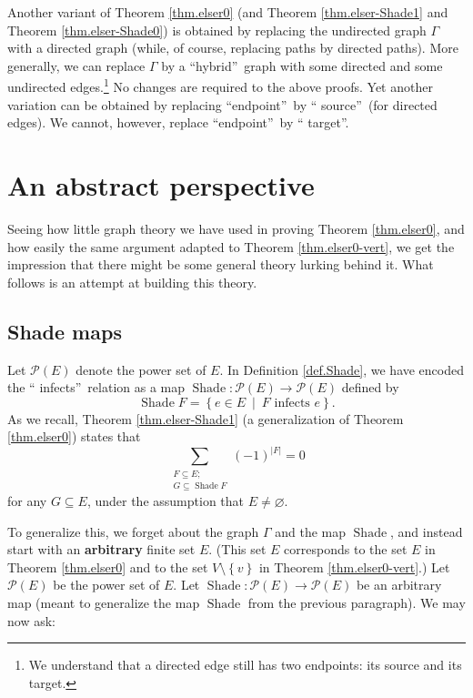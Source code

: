 \documentclass[numbers=enddot,12pt,final,onecolumn]{scrartcl}%
\theoremstyle{definition}
\let\sumnonlimits\sum
\renewcommand{\sum}{\sumnonlimits\limits}
\begin{document}
Another variant of Theorem \ref{thm.elser0} (and Theorem
\ref{thm.elser-Shade1} and Theorem \ref{thm.elser-Shade0}) is obtained by
replacing the undirected graph $\Gamma$ with a directed graph (while, of
course, replacing paths by directed paths). More generally, we can replace
$\Gamma$ by a \textquotedblleft hybrid\textquotedblright\ graph with some
directed and some undirected edges.\footnote{We understand that a directed
edge still has two endpoints: its source and its target.} No changes are
required to the above proofs. Yet another variation can be obtained by
replacing \textquotedblleft endpoint\textquotedblright\ by \textquotedblleft
source\textquotedblright\ (for directed edges). We cannot, however, replace
\textquotedblleft endpoint\textquotedblright\ by \textquotedblleft
target\textquotedblright.

\section{\label{sec.abstract}An abstract perspective}

Seeing how little graph theory we have used in proving Theorem
\ref{thm.elser0}, and how easily the same argument adapted to Theorem
\ref{thm.elser0-vert}, we get the impression that there might be some general
theory lurking behind it. What follows is an attempt at building this theory.

\subsection{Shade maps}

Let $\mathcal{P}\left(  E\right)  $ denote the power set of $E$. In Definition
\ref{def.Shade}, we have encoded the \textquotedblleft
infects\textquotedblright\ relation as a map $\operatorname*{Shade}%
:\mathcal{P}\left(  E\right)  \rightarrow\mathcal{P}\left(  E\right)  $
defined by%
\[
\operatorname*{Shade}F=\left\{  e\in E\ \mid\ F\text{ infects }e\right\}  .
\]
As we recall, Theorem \ref{thm.elser-Shade1} (a generalization of Theorem
\ref{thm.elser0}) states that
\begin{equation}
\sum_{\substack{F\subseteq E;\\G\subseteq\operatorname*{Shade}F}}\left(
-1\right)  ^{\left\vert F\right\vert }=0 \label{eq.Shade.goal}%
\end{equation}
for any $G\subseteq E$, under the assumption that $E\neq\varnothing$.

To generalize this, we forget about the graph $\Gamma$ and the map
$\operatorname*{Shade}$, and instead start with an \textbf{arbitrary} finite
set $E$. (This set $E$ corresponds to the set $E$ in Theorem \ref{thm.elser0}
and to the set $V\setminus\left\{  v\right\}  $ in Theorem
\ref{thm.elser0-vert}.) Let $\mathcal{P}\left(  E\right)  $ be the power set
of $E$. Let $\operatorname*{Shade}:\mathcal{P}\left(  E\right)  \rightarrow
\mathcal{P}\left(  E\right)  $ be an arbitrary map (meant to generalize the
map $\operatorname*{Shade}$ from the previous paragraph). We may now ask:
\end{document}
